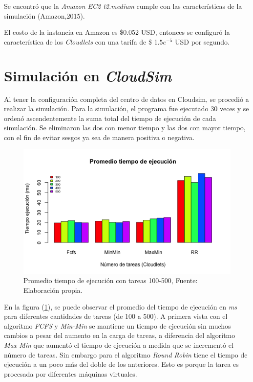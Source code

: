 Se encontró que la \textit{Amazon EC2 t2.medium} cumple con las características de la simulación (Amazon,2015).

El costo de la instancia en Amazon es \$0.052 USD, entonces se configuró la característica  de los \textit{Cloudlets} con una tarifa de \$ 1.$5 e^{-5}$ USD por segundo.

 




\newpage
\section{Simulación en \textit{CloudSim}}

Al tener la configuración completa del centro de datos en Cloudsim, se procedió a realizar la simulación.
Para la simulación, el programa fue ejecutado 30 veces y se ordenó ascendentemente la suma total del tiempo de ejecución de cada simulación. Se eliminaron las dos con menor tiempo y las dos con mayor tiempo, con el fin de evitar sesgos ya sea de manera positiva o negativa.

\setcounter{figure}{24}
\renewcommand\thefigure{\arabic{figure}}
\begin{figure}[h!] 
	\centering
	\includegraphics[scale=0.6]{media/tiempoejecucionjpg}
	\caption{Promedio tiempo de ejecuci\'on con tareas 100-500, Fuente: Elaboraci\'on propia.}
	\label{fig:tiempo}
\end{figure}



En la figura (\ref{fig:tiempo}), se puede observar el promedio del tiempo de ejecuci\'on en \emph{ms} para diferentes cantidades de tareas (de 100 a 500). A primera vista con el algoritmo \textit{FCFS} y \textit{Min-Min} se mantiene un tiempo de ejecuci\'on sin muchos cambios a pesar del aumento en la carga de tareas, a diferencia del algoritmo \textit{Max-Min} que aument\'o el tiempo de ejecuci\'on a medida que se increment\'o el n\'umero de tareas. Sin embargo para el algoritmo \textit{Round Robin} tiene el tiempo de ejecución a un poco más del doble de los anteriores. Esto es porque la tarea es procesada por diferentes máquinas virtuales.

